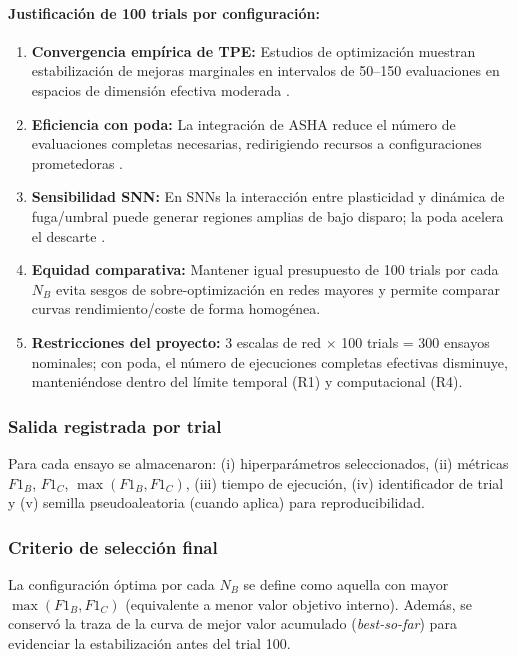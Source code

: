\paragraph{Justificación de 100 trials por configuración:}
\begin{enumerate}
    \item \textbf{Convergencia empírica de TPE:} Estudios de optimización muestran estabilización de mejoras marginales en intervalos de 50--150 evaluaciones en espacios de dimensión efectiva moderada \cite{bergstra_random_2012, akiba_optuna_2019}.
    \item \textbf{Eficiencia con poda:} La integración de ASHA reduce el número de evaluaciones completas necesarias, redirigiendo recursos a configuraciones prometedoras \cite{li_system_2020, noauthor_efficient_2021}.
    \item \textbf{Sensibilidad SNN:} En SNNs la interacción entre plasticidad y dinámica de fuga/umbral puede generar regiones amplias de bajo disparo; la poda acelera el descarte \cite{firmin_parallel_2024, parsa_bayesian-based_2019}.
    \item \textbf{Equidad comparativa:} Mantener igual presupuesto de 100 trials por cada $N_B$ evita sesgos de sobre-optimización en redes mayores y permite comparar curvas rendimiento/coste de forma homogénea.
    \item \textbf{Restricciones del proyecto:} 3 escalas de red $\times$ 100 trials = 300 ensayos nominales; con poda, el número de ejecuciones completas efectivas disminuye, manteniéndose dentro del límite temporal (R1) y computacional (R4).
\end{enumerate}

\subsubsection{Salida registrada por trial}
Para cada ensayo se almacenaron: (i) hiperparámetros seleccionados, (ii) métricas $F1_B$, $F1_C$, $\max(F1_B,F1_C)$, (iii) tiempo de ejecución, (iv) identificador de trial y (v) semilla pseudoaleatoria (cuando aplica) para reproducibilidad.

\subsubsection{Criterio de selección final}
La configuración óptima por cada $N_B$ se define como aquella con mayor $\max(F1_B,F1_C)$ (equivalente a menor valor objetivo interno). Además, se conservó la traza de la curva de mejor valor acumulado (\emph{best-so-far}) para evidenciar la estabilización antes del trial 100.


